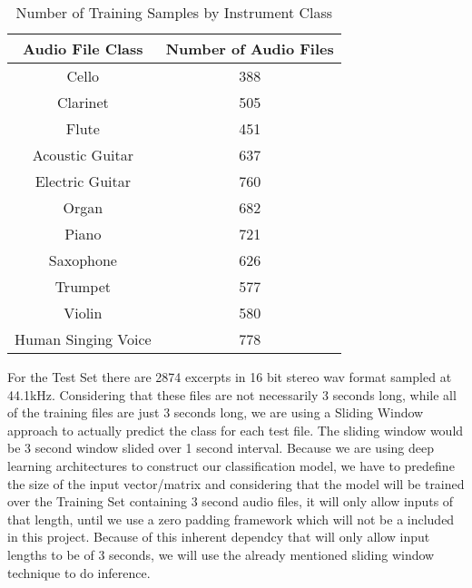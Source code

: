 \documentclass[11pt]{article}
\begin{document}
\begin{table}
\centering
\caption{Number of Training Samples by Instrument Class}
\begin{tabular}{| c || c |} %
\hline %
 Audio File Class &  Number of Audio Files \\
   \hline \hline
Cello   &   388 \\
\hline
Clarinet  &   505 \\
\hline
Flute  &   451 \\
\hline
Acoustic Guitar  &  637 \\
\hline
Electric Guitar &  760 \\
\hline
Organ  &   682 \\
\hline
Piano  &   721 \\
\hline
Saxophone  &   626 \\
\hline
Trumpet &   577 \\
\hline
Violin &   580 \\
\hline
Human Singing Voice  &   778 \\
\hline
   \end{tabular}
\label{tab:pd} 
\end{table}

For the Test Set there are 2874 excerpts in 16 bit stereo wav format sampled at 44.1kHz. Considering that these files are not necessarily 3 seconds long, while all of the training files are just 3 seconds long, we are using a Sliding Window approach to actually predict the class for each test file. The sliding window would be 3 second window slided over 1 second interval. Because we are using deep learning architectures to construct our classification model, we have to predefine the size of the input vector/matrix and considering that the model will be trained over the Training Set containing 3 second audio files, it will only allow inputs of that length, until we use a zero padding framework which will not be a included in this project. Because of this inherent dependcy that will only allow input lengths to be of 3 seconds, we will use the already mentioned sliding window technique to do inference.
\end{document}
